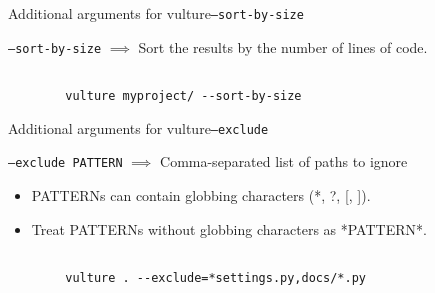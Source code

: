 \documentclass{beamer}
\begin{document}

\begin{frame}{Additional arguments for vulture}{\texttt{--sort-by-size}}

\texttt{--sort-by-size} \begin{math} \implies \end{math} Sort the results by the number of lines of code.

\begin{example}
    \begin{verbatim}

        vulture myproject/ --sort-by-size

    \end{verbatim}

\end{example}
\end{frame}


\begin{frame}{Additional arguments for vulture}{\texttt{--exclude}}
    
\texttt{--exclude PATTERN} \begin{math} \implies \end{math} Comma-separated list of paths to ignore 

\begin{itemize}
    \item
        PATTERNs can contain globbing
        characters (*, ?, [, ]).
    \item
        Treat PATTERNs without
        globbing characters as *PATTERN*.
\end{itemize}


\begin{example}
        \begin{verbatim}

        vulture . --exclude=*settings.py,docs/*.py

        \end{verbatim}
        
\end{example}
\end{frame}
\end{document}

